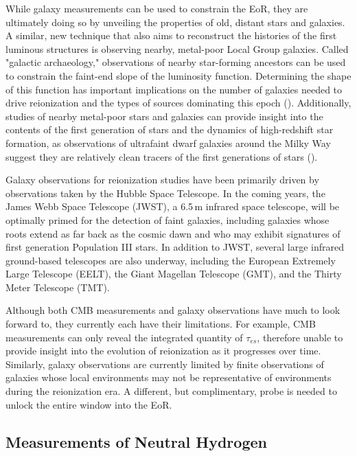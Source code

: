 While galaxy measurements can be used to constrain the EoR, they are ultimately doing so by unveiling the properties of old, distant stars and galaxies. A similar, new technique that also aims to reconstruct the histories of the first luminous structures is observing nearby, metal-poor Local Group galaxies. Called "galactic archaeology," observations of nearby star-forming ancestors can be used to constrain the faint-end slope of the luminosity function. Determining the shape of this function has important implications on the number of galaxies needed to drive reionization and the types of sources dominating this epoch (\citealt{weisz2017}). Additionally, studies of nearby metal-poor stars and galaxies can provide insight into the contents of the first generation of stars and the dynamics of high-redshift star formation, as observations of ultrafaint dwarf galaxies around the Milky Way suggest they are relatively clean tracers of the first generations of stars (\citealt{loeb_furlanetto_2013}).

Galaxy observations for reionization studies have been primarily driven by observations taken by the Hubble Space Telescope. In the coming years, the James Webb Space Telescope (JWST), a 6.5\,m infrared space telescope, will be optimally primed for the detection of faint galaxies, including galaxies whose roots extend as far back as the cosmic dawn and who may exhibit signatures of first generation Population III stars. In addition to JWST, several large infrared ground-based telescopes are also underway, including the European Extremely Large Telescope (EELT), the Giant Magellan Telescope (GMT), and the Thirty Meter Telescope (TMT). 

Although both CMB measurements and galaxy observations have much to look forward to, they currently each have their limitations. For example, CMB measurements can only reveal the integrated quantity of $\tau_{es}$, therefore unable to provide insight into the evolution of reionization as it progresses over time. Similarly, galaxy observations are currently limited by finite observations of galaxies whose local environments may not be representative of environments during the reionization era. A different, but complimentary, probe is needed to unlock the entire window into the EoR.

\subsection{Measurements of Neutral Hydrogen}
\label{sec:eor_evolution}

